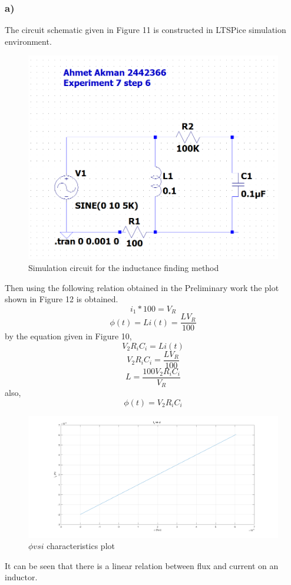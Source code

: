 \documentclass[letterpaper,12pt]{article}
\begin{document}
\subsubsection{a)}
The circuit schematic given in Figure 11 is constructed in LTSPice simulation environment.
\begin{figure}[H]
	\centering
   \includegraphics[width=1\textwidth]{6_SCH.png}
   \caption{Simulation circuit for the inductance finding method}
\end{figure}
Then using the following relation obtained in the Preliminary work the plot shown in Figure 12 is obtained.
\[
i_1*100 = V_R
\]
\[
	\phi(t) = L i(t) = \frac{L V_R}{100}
\]
by the equation given in Figure 10,
\[V_2 R_i C_i = L i(t)\]
\[V_2 R_i C_i = \frac{L V_R}{100}\]
\[L = \frac{100 V_2 R_i C_i}{V_R}\]
also,
\[\phi(t) = V_2 R_i C_i\]

\begin{figure}[H]
	\centering
   \includegraphics[width=1\textwidth]{PRE_7c.png}
   \caption{\(\phi vs i\) characteristics plot}
\end{figure}
It can be seen that there is a linear relation between flux and current on an inductor.
\end{document}
